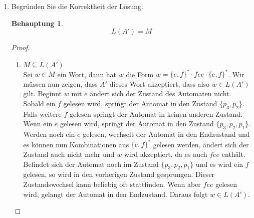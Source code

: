 \documentclass[a4paper]{scrartcl}
\newtheorem*{behaupt}{Behauptung}
\begin{document}
\begin{enumerate}
    \item Begründen Sie die Korrektheit der Lösung. \\
        \begin{behaupt}
            \begin{equation*}
                L(A') = M
            \end{equation*}
        \end{behaupt}
        \begin{proof} \hfill \\
            \begin{enumerate}
                \item $M \subseteq L(A')$ \\
                    Sei $w \in M$ ein Wort, dann hat $w$ die Form 
                    $w = \{e,f\}^* \cdot fee \cdot \{e,f\}^*$.
                    Wir müssen nun zeigen, dass $A'$ dieses Wort akzeptiert, 
                    dass also $w \in L(A')$ gilt. Beginnt $w$ mit $e$ ändert
                    sich der Zustand des Automaten nicht. Sobald ein $f$ 
                    gelesen wird, springt der Automat in den Zustand 
                    $\{p_3,p_2\}$. Falls weitere $f$ gelesen springt der
                    Automat in keinen anderen Zustand. Wenn ein $e$ gelesen wird,
                    springt der Automat in den Zustand $\{p_3,p_2,p_1\}$.
                    Werden noch ein $e$ gelesen, wechselt der Automat in den Endzustand
                    und es können nun Kombinationen aus $\{e,f\}^*$ gelesen werden,
                    ändert sich der Zustand auch nicht mehr und $w$ wird akzeptiert,
                    da es auch $fee$ enthält. Befindet sich der Automat noch im Zustand
                    $\{p_3,p_2,p_1\}$ und es wird ein $f$ gelesen, so wird in den vorherigen 
                    Zustand gesprungen. Dieser Zustandswechsel kann beliebig oft stattfinden.
                    Wenn aber $fee$ gelesen wird, gelangt der Automat in den Endzustand.
                    Daraus folgt $w \in L(A')$.
                    

\end{enumerate}
\end{proof}
\end{enumerate}
\end{document}
